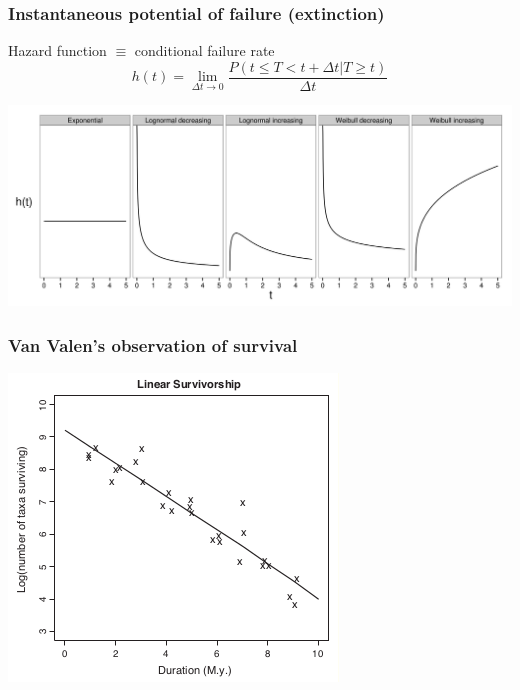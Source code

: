 \documentclass{beamer} \usepackage{amsmath,amsthm}
\begin{document}
\begin{frame}
  \frametitle{Instantaneous potential of failure (extinction)}

  \begin{block}{Hazard function \(\equiv\) conditional failure rate}
    \[
      h(t) = \lim_{\Delta t \to 0} \frac{P(t \leq T < t + \Delta t | T \geq t)}{\Delta t}
    \]
  \end{block}

  \begin{center}
    \includegraphics[height = 0.5\textheight, width = \textwidth, keepaspectratio = true]{figure/hazard}
  \end{center}
\end{frame}

\begin{frame}
  \frametitle{Van Valen's observation of survival}

  \begin{center}
    \includegraphics[height = 0.7\textheight, keepaspectratio = true]{figure/liow}

    \tiny{}
  \end{center}
\end{frame}
\end{document}
